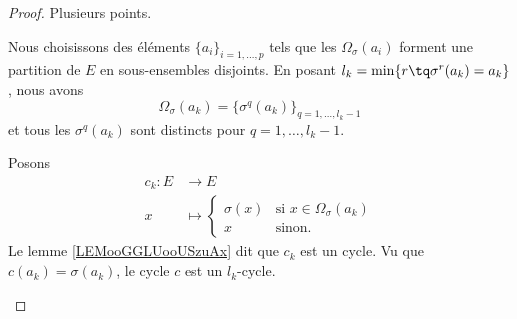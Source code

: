\begin{proof}
	Plusieurs points.
	\begin{subproof}
		\spitem[Existence]
		Nous choisissons des éléments \( \{ a_i \}_{i=1,\ldots, p}\) tels que les \( \Omega_{\sigma}(a_i)\) forment une partition de \( E\) en sous-ensembles disjoints. En posant \( l_k=\min\{ r\tq \sigma^r(a_k)=a_k \}\), nous avons
		\begin{equation}
			\Omega_{\sigma}(a_k)=\{ \sigma^q(a_k) \}_{q=1,\ldots, l_k-1}
		\end{equation}
		et tous les \( \sigma^q(a_k)\) sont distincts pour \( q=1,\ldots, l_k-1\).

		Posons
		\begin{equation}
			\begin{aligned}
				c_k\colon E & \to E                                                    \\
				x           & \mapsto \begin{cases}
					                      \sigma(x) & \text{si } x\in \Omega_{\sigma}(a_k) \\
					                      x         & \text{sinon. }
				                      \end{cases}
			\end{aligned}
		\end{equation}
		Le lemme \ref{LEMooGGLUooUSzuAx} dit que \( c_k\) est un cycle. Vu que \( c(a_k)=\sigma(a_k)\), le cycle \( c\) est un \( l_k\)-cycle.


\end{subproof}
\end{proof}
